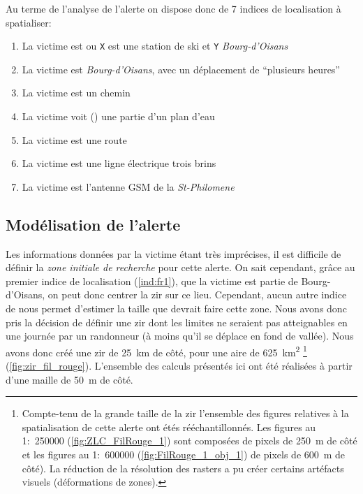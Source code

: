 Au terme de l'analyse de l'alerte on dispose donc de 7 indices de
localisation à spatialiser:
% 
\begin{enumerate}
\item \label{ind:fr1} La victime est
   ou \texttt{X} est
  une station de ski et \texttt{Y} \emph{Bourg-d'Oisans}
\item \label{ind:fr2} La victime est
   \emph{Bourg-d'Oisans}, avec un
  déplacement de \enquote{plusieurs heures}
\item \label{ind:fr3} La victime est  un
  chemin
\item \label{ind:fr4} La victime voit ()
  une partie d'un plan d'eau
\item \label{ind:fr5} La victime est  une
  route
\item \label{ind:fr6} La victime est  une
  ligne électrique trois brins
\item \label{ind:fr7} La victime est 
  l'antenne GSM de la \emph{St-Philomene}
\end{enumerate}

\subsection{Modélisation de l'alerte}
\label{subsec:9-4-2}

Les informations données par la victime étant très imprécises, il est
difficile de définir la \emph{zone initiale de recherche} pour cette
alerte. On sait cependant, grâce au premier indice de localisation
(\ref{ind:fr1}), que la victime est partie de Bourg-d'Oisans, on peut
donc centrer la \ac{zir} sur ce lieu. Cependant, aucun autre indice de
nous permet d'estimer la taille que devrait faire cette zone. Nous
avons donc pris la décision de définir une \ac{zir} dont les limites
ne seraient pas atteignables en une journée par un randonneur (à moins
qu'il se déplace en fond de vallée).
%
Nous avons donc créé une \ac{zir} de \SI{25}{\kilo\meter} de côté,
pour une aire de \SI{625}{\kilo\meter\squared} \footnote{Compte-tenu
  de la grande taille de la \ac{zir} l'ensemble des figures relatives
  à la spatialisation de cette alerte ont étés rééchantillonnés. Les
  figures au 1:~\num{250000} (\eg \autoref{fig:ZLC_FilRouge_1}) sont
  composées de pixels de \SI{250}{\meter} de côté et les figures au
  1:~\num{600000} (\eg \autoref{fig:FilRouge_1_obj_1}) de pixels de
  \SI{600}{\meter} de côté). La réduction de la résolution des rasters
  a pu créer certains artéfacts visuels (\eg déformations de zones).}
(\autoref{fig:zir_fil_rouge}). L'ensemble des calculs présentés ici
ont été réalisées à partir d'une maille de \SI{50}{\meter} de côté.

